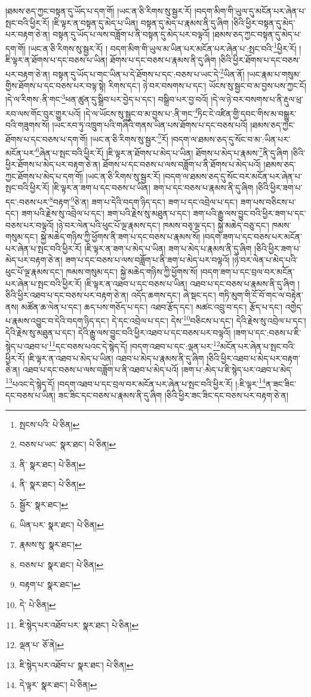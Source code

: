 །ཐམས་ཅད་ཀྱང་བསྟན་དུ་ཡོད་པ་དག་གོ། །ཡང་ན་ཅི་རིགས་སུ་སྦྱར་རོ། །བདག་མིག་གི་ཡུལ་དུ་མངོན་པར་ཞེན་པ་སྤང་བའི་ཕྱིར་རོ། །ཇི་ལྟར་ན་བསྟན་དུ་མེད་པ་ཡིན། བསྟན་དུ་མེད་པ་རྣམས་ནི་དུ་ཞིག །ཅིའི་ཕྱིར་བསྟན་དུ་མེད་པར་བརྟག་ཅེ་ན། བསྟན་དུ་ཡོད་པ་ལས་བཟློག་པ་ནི་བསྟན་དུ་མེད་པར་བལྟའོ། །ཐམས་ཅད་ཀྱང་བསྟན་དུ་མེད་པ་དག་གོ། །ཡང་ན་ཅི་རིགས་སུ་སྦྱར་རོ། །
བདག་མིག་གི་ཡུལ་མ་ཡིན་པར་མངོན་པར་ཞེན་པ་:སྤང་བའི་\footnote{སྤངས་པའི་  པེ་ཅིན། }ཕྱིར་རོ། །ཇི་ལྟར་ན་ཐོགས་པ་དང་བཅས་པ་ཡིན། ཐོགས་པ་དང་བཅས་པ་རྣམས་ནི་དུ་ཞིག །ཅིའི་ཕྱིར་ཐོགས་པ་དང་བཅས་པར་བརྟག་ཅེ་ན། བསྟན་དུ་ཡོད་པ་གང་ཡིན་པ་དེ་ཐོགས་པ་དང་:བཅས་པ་ཡང་དེ་\footnote{བཅས་པ་ཡང་  སྣར་ཐང་།  པེ་ཅིན། }ཡིན་ནོ། །ཡང་རྣམ་པ་གསུམ་གྱིས་ཐོགས་པ་དང་བཅས་པར་བལྟ་སྟེ། རིགས་དང་། ཉེ་བར་བསགས་པ་དང་། ཡོངས་སུ་སྦྱང་བ་མ་བྱས་པས་ཀྱང་ངོ། །དེ་ལ་རིགས་:ནི་གང་\footnote{ནི་  སྣར་ཐང་།  པེ་ཅིན། }ཕན་ཚུན་དུ་སྒྲིབ་པར་བྱེད་པ་དང་། བསྒྲིབ་པར་བྱ་བའོ། །དེ་ལ་ཉེ་བར་བསགས་པ་ནི་རྡུལ་ཕྲ་རབ་ལས་གོང་བུར་གྱུར་པའོ། །དེ་ལ་ཡོངས་སུ་སྦྱང་བ་མ་བྱས་པ་:ནི་གང་\footnote{ནི་  སྣར་ཐང་།  པེ་ཅིན། }ཏིང་ངེ་འཛིན་གྱི་དབང་གིས་མ་བསྒྱུར་བའི་གཟུགས་སོ། །ཡང་རབ་ཏུ་འཁྲུག་པའི་གཞིའི་གནས་ཡིན་པས་ཐོགས་པ་དང་བཅས་པའོ། །ཐམས་ཅད་ཀྱང་ཐོགས་པ་དང་བཅས་པ་དག་གོ། །ཡང་ན་ཅི་རིགས་སུ་སྦྱར་\footnote{སྦྱོར་  སྣར་ཐང་། }རོ། །བདག་ལ་ཐམས་ཅད་དུ་སོང་བ་མ་:ཡིན་པར་མངོན་པར་\footnote{ཡིན་པར་  སྣར་ཐང་།  པེ་ཅིན། }ཞེན་པ་སྤང་བའི་ཕྱིར་རོ། །ཇི་ལྟར་ན་ཐོགས་པ་མེད་པ་ཡིན། ཐོགས་པ་མེད་པ་རྣམས་\footnote{རྣམས་སུ་  སྣར་ཐང་། }ནི་དུ་ཞིག །ཅིའི་ཕྱིར་ཐོགས་པ་མེད་པར་བརྟག་ཅེ་ན། ཐོགས་པ་དང་བཅས་པ་ལས་བཟློག་པ་ནི་ཐོགས་པ་མེད་པའོ། །ཐམས་ཅད་ཀྱང་ཐོགས་པ་མེད་པ་དག་གོ། །ཡང་ན་ཅི་རིགས་སུ་སྦྱར་རོ། །བདག་ལ་ཐམས་ཅད་དུ་སོང་བར་མངོན་པར་ཞེན་པ་སྤང་བའི་ཕྱིར་རོ། །ཇི་ལྟར་ན་ཟག་པ་དང་བཅས་པ་ཡིན། ཟག་པ་དང་བཅས་པ་རྣམས་ནི་དུ་ཞིག །ཅིའི་ཕྱིར་ཟག་པ་དང་:བཅས་པར་\footnote{བཅས་པ་  སྣར་ཐང་།  པེ་ཅིན། }བརྟག་\footnote{བརྟག་པ་  སྣར་ཐང་། }ཅེ་ན། ཟག་པ་དེའི་བདག་ཉིད་དང་། ཟག་པ་དང་འབྲེལ་པ་དང་། ཟག་པས་བཅིངས་པ་དང་། ཟག་པའི་རྗེས་སུ་འབྲེལ་པ་དང་། ཟག་པའི་རྗེས་སུ་མཐུན་པ་དང་། ཟག་པའི་རྒྱུ་ལས་བྱུང་བའི་ཕྱིར་ཟག་པ་དང་བཅས་པར་བལྟའོ། །ཉེ་བར་ལེན་པའི་ཕུང་པོ་ལྔ་རྣམས་དང་། ཁམས་བཅྭ་ལྔ་དང་། སྐྱེ་མཆེད་བཅུ་དང་། ཁམས་གསུམ་དང་། སྐྱེ་མཆེད་གཉིས་ཀྱི་ཕྱོགས་ནི་ཟག་པ་དང་བཅས་པ་རྣམས་སོ། །བདག་ཟག་པ་དང་བཅས་པར་མངོན་པར་ཞེན་པ་སྤང་བའི་ཕྱིར་རོ། །ཇི་ལྟར་ན་ཟག་པ་མེད་པ་ཡིན། ཟག་པ་མེད་པ་རྣམས་ནི་དུ་ཞིག །ཅིའི་ཕྱིར་ཟག་པ་མེད་པར་བརྟག་ཅེ་ན། ཟག་པ་དང་བཅས་པ་ལས་བཟློག་པ་ནི་ཟག་པ་མེད་པར་བལྟའོ། །ཉེ་བར་ལེན་པ་མེད་པའི་ཕུང་པོ་ལྔ་རྣམས་དང་། ཁམས་གསུམ་དང་། སྐྱེ་མཆེད་གཉིས་ཀྱི་ཕྱོགས་སོ། །བདག་ཟག་པ་དང་བྲལ་བར་མངོན་པར་ཞེན་པ་སྤང་བའི་ཕྱིར་རོ། །ཇི་ལྟར་ན་འཐབ་པ་དང་བཅས་པ་ཡིན། འཐབ་པ་དང་བཅས་པ་རྣམས་ནི་དུ་ཞིག །ཅིའི་ཕྱིར་འཐབ་པ་དང་བཅས་པར་བརྟག་ཅེ་ན། འདོད་ཆགས་དང་། ཞེ་སྡང་དང་། གཏི་མུག་གི་ངོ་བོ་གང་ལ་བརྟེན་ནས། མཚོན་ཆ་ལེན་པ་དང་། ཆད་པས་གཅོད་པ་དང་། འཐབ་རྩོད་དང་། མཚང་འབྲུ་བ་དང་། རྩོད་པ་དང་། འགྱེད་པ་རྣམས་འབྱུང་བ་དེའི་བདག་ཉིད་དང་། དེ་དང་འབྲེལ་པ་དང་། དེས་\footnote{དེ་  པེ་ཅིན། }བཅིངས་པ་དང་། དེའི་རྗེས་སུ་འབྲེལ་པ་དང་། དེའི་རྗེས་སུ་མཐུན་པ་དང་། དེའི་རྒྱུ་ལས་བྱུང་བའི་ཕྱིར་འཐབ་པ་དང་བཅས་པར་བལྟའོ། །ཟག་པ་དང་:བཅས་པ་ཇི་སྙེད་པ་འཐབ་པ་\footnote{ཇི་སྙེད་པར་འཐོབ་པར་  སྣར་ཐང་།  པེ་ཅིན། }དང་བཅས་པའང་དེ་སྙེད་དོ། །བདག་འཐབ་པ་དང་:ལྡན་པར་\footnote{ལྡན་པ་  ཅོ་ནེ། }མངོན་པར་ཞེན་པ་སྤང་བའི་ཕྱིར་རོ། །ཇི་ལྟར་ན་འཐབ་པ་མེད་པ་ཡིན། འཐབ་པ་མེད་པ་རྣམས་ནི་དུ་ཞིག །ཅིའི་ཕྱིར་འཐབ་པ་མེད་པར་བརྟག་ཅེ་ན། འཐབ་པ་དང་བཅས་པ་ལས་བཟློག་པ་ནི་འཐབ་པ་མེད་པའོ། །ཟག་པ་:མེད་པ་ཇི་སྙེད་པར་འཐབ་པ་མེད་\footnote{ཇི་སྙེད་པར་འཐོབ་པ་  སྣར་ཐང་།  པེ་ཅིན། }པའང་དེ་སྙེད་དོ། །བདག་འཐབ་པ་དང་བྲལ་བར་མངོན་པར་ཞེན་པ་སྤང་བའི་ཕྱིར་རོ། །:ཇི་ལྟར་\footnote{དེ་ལྟར་  སྣར་ཐང་།  པེ་ཅིན། }ན་ཟང་ཟིང་དང་བཅས་པ་ཡིན། ཟང་ཟིང་དང་བཅས་པ་རྣམས་ནི་དུ་ཞིག །ཅིའི་ཕྱིར་ཟང་ཟིང་དང་བཅས་པར་བརྟག་ཅེ་ན། 